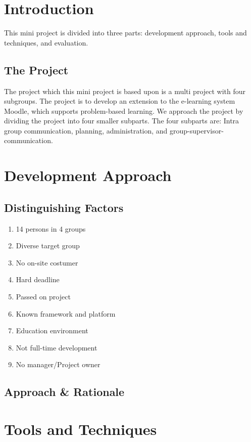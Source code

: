 \documentclass{article}
\begin{document}
\section{Introduction}
This mini project is divided into three parts: development approach, tools and techniques, and evaluation.
\subsection{The Project}
The project which this mini project is based upon is a multi project with four subgroups.
The project is to develop an extension to the e-learning system Moodle, which supports problem-based learning.
We approach the project by dividing the project into four smaller subparts.
The four subparts are: Intra group communication, planning, administration, and group-supervisor-communication.

\section{Development Approach}

\subsection{Distinguishing Factors}
\begin{enumerate}
	\item 14 persons in 4 groups
	\item Diverse target group
	\item No on-site costumer
	\item Hard deadline
	\item Passed on project
	\item Known framework and platform
	\item Education environment
	\item Not full-time development
	\item No manager/Project owner
\end{enumerate}

\subsection{Approach \& Rationale}


\section{Tools and Techniques}
\end{document}
